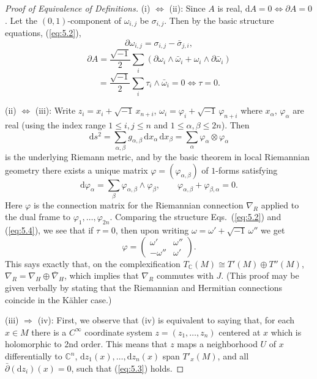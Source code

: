 \documentclass[11pt]{amsart}
\theoremstyle{plain}
\theoremstyle{definition}
\newcommand{\dd}{\mathrm{d}}
\newcommand{\CC}{\mathbb{C}}
\begin{document}
\begin{proof}[Proof of Equivalence of Definitions]
(i) $\Leftrightarrow$ (ii): Since $A$ is real, $\dd A = 0 \Leftrightarrow \partial A = 0$. Let the $(0,1)$-component of $\omega_{i,j}$ be $\sigma_{i,j}$. Then by the basic structure equations, (\ref{eq:5.2}),
\[
\partial\omega_{i,j} = \sigma_{i,j} - \bar{\sigma}_{j,i},
\]
\[
\partial A = \frac{\sqrt{-1}}{2} \sum_{i} (\partial\omega_{i} \wedge \bar{\omega}_{i} + \omega_{i} \wedge \partial\bar{\omega}_{i})
\]
\[
= \frac{\sqrt{-1}}{2} \sum_{i} \tau_{i} \wedge \bar{\omega}_{i} = 0 \Leftrightarrow \tau = 0.
\]

(ii) $\Leftrightarrow$ (iii): Write $z_{i} = x_{i} + \sqrt{-1}\, x_{n+i}$, $\omega_{i} = \varphi_{i} + \sqrt{-1}\, \varphi_{n+i}$ where $x_{\alpha}$, $\varphi_{\alpha}$ are real (using the index range $1 \le i, j \le n$ and $1 \le \alpha, \beta \le 2n$). Then
\[
\dd s^{2} = \sum_{\alpha, \beta} g_{\alpha,\beta}\, \dd x_{\alpha}\, \dd x_{\beta} = \sum_{\alpha} \varphi_{\alpha} \otimes \varphi_{\alpha}
\]
is the underlying Riemann metric, and by the basic theorem in local Riemannian geometry there exists a unique matrix $\varphi = (\varphi_{\alpha,\beta})$ of $1$-forms satisfying
\begin{equation}\label{eq:5.4}
\dd\varphi_{\alpha} = \sum_{\beta} \varphi_{\alpha,\beta} \wedge \varphi_{\beta}, \qquad \varphi_{\alpha,\beta} + \varphi_{\beta,\alpha} = 0.
\end{equation}
Here $\varphi$ is the connection matrix for the Riemannian connection $\nabla_{R}$ applied to the dual frame to $\varphi_{1}, \ldots, \varphi_{2n}$. Comparing the structure Eqs.~(\ref{eq:5.2}) and (\ref{eq:5.4}), we see that if $\tau = 0$, then upon writing $\omega = \omega' + \sqrt{-1}\, \omega''$ we get
\[
\varphi = \begin{pmatrix} \omega' & \omega'' \\ -\omega'' & \omega' \end{pmatrix}.
\]
This says exactly that, on the complexification $T_{\CC}(M) \cong T'(M) \oplus T''(M)$, $\nabla_{R} = \nabla_{H} \oplus \overline{\nabla}_{H}$, which implies that $\nabla_{R}$ commutes with $J$. (This proof may be given verbally by stating that the Riemannian and Hermitian connections coincide in the K\"ahler case.)

(iii) $\Rightarrow$ (iv): First, we observe that (iv) is equivalent to saying that, for each $x \in M$ there is a $C^{\infty}$ coordinate system $z = (z_{1}, \ldots, z_{n})$ centered at $x$ which is holomorphic to 2nd order. This means that $z$ maps a neighborhood $U$ of $x$ differentially to $\CC^{n}$, $\dd z_{1}(x), \ldots, \dd z_{n}(x)$ span $T'_{x}(M)$, and all $\bar{\partial}(\dd z_{i})(x) = 0$, such that (\ref{eq:5.3}) holds.


\end{proof}
\end{document}
